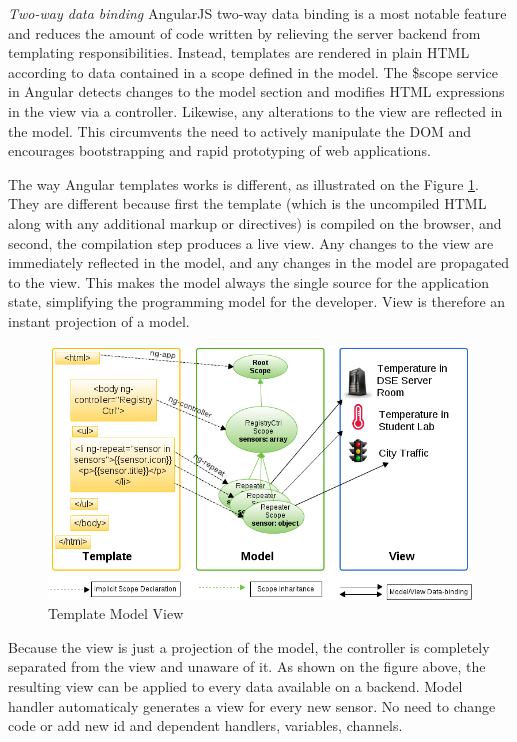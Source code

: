    \emph{Two-way data binding}
   \newline
	AngularJS two-way data binding is a most notable feature and reduces the amount of code written by relieving the server backend from templating responsibilities. Instead, templates are rendered in plain HTML according to data contained in a scope defined in the model. The \$scope service in Angular detects changes to the model section and modifies HTML expressions in the view via a controller. Likewise, any alterations to the view are reflected in the model. This circumvents the need to actively manipulate the DOM and encourages bootstrapping and rapid prototyping of web applications.

	The way Angular templates works is different, as illustrated on the Figure \ref{img:tmv}. They are different because first the template (which is the uncompiled HTML along with any additional markup or directives) is compiled on the browser, and second, the compilation step produces a live view. Any changes to the view are immediately reflected in the model, and any changes in the model are propagated to the view. This makes the model always the single source for the application state, simplifying the programming model for the developer. View is therefore an instant projection of a model.

	    \begin{figure}[!ht]
		\centering
		\includegraphics[scale=0.6]{images/3wayBinding.png}   
		\caption[Template Model View]{Template Model View} 
		\label{img:tmv}
		\end{figure}
        
    Because the view is just a projection of the model, the controller is completely separated from the view and unaware of it. As shown on the figure above, the resulting view can be applied to every data available on a backend. Model handler automaticaly generates a view for every new sensor. No need to change code or add new id and dependent handlers, variables, channels. 
    
